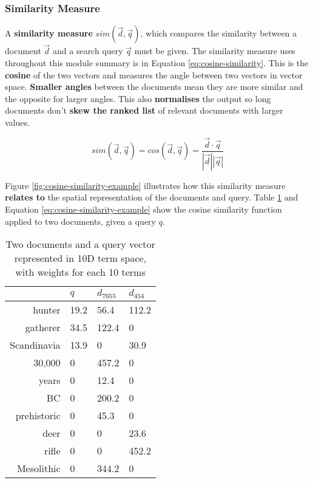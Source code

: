 \documentclass{article}
\begin{document}
\subsubsection{Similarity Measure}

A \textbf{similarity measure} $sim(\vec{d}, \vec{q})$, which compares the similarity between a document $\vec{d}$ and a search query $\vec{q}$ must be given. The similarity measure uses throughout this module summary is in Equation \ref{eq:cosine-similarity}. This is the \textbf{cosine} of the two vectors and measures the angle between two vectors in vector space. \textbf{Smaller angles} between the documents mean they are more similar and the opposite for larger angles. This also \textbf{normalises} the output so long documents don't \textbf{skew the ranked list} of relevant documents with larger values.

\begin{equation}
	sim(\vec{d}, \vec{q}) = cos(\vec{d}, \vec{q}) = \frac{\vec{d} \cdot \vec{q}}{|\vec{d}| |\vec{q}|}
	\label{eq:cosine-similarity}
\end{equation}

Figure \ref{fig:cosine-similarity-example} illustrates how this similarity measure \textbf{relates to} the spatial representation of the documents and query. Table \ref{tab:cosine-similarity-example} and Equation \ref{eq:cosine-similarity-example} show the cosine similarity function applied to two documents, given a query $q$.

\begin{table}[H]
	\centering
	\begin{tabular}{|r|l|l|l|}
		\hline
		& $q$ & $d_{7655}$ & $d_{454}$ \\
		\hline
		hunter & 19.2 & 56.4 & 112.2 \\
		gatherer & 34.5 & 122.4 & 0 \\
		Scandinavia & 13.9 & 0 & 30.9 \\
		30,000 & 0 & 457.2 & 0 \\
		years & 0 & 12.4 & 0 \\
		BC & 0 & 200.2 & 0 \\
		prehistoric & 0 & 45.3 & 0 \\
		deer & 0 & 0 & 23.6 \\
		rifle & 0 & 0 & 452.2 \\
		Mesolithic & 0 & 344.2 & 0 \\
		\hline
	\end{tabular}
	\caption{Two documents and a query vector represented in 10D term space, with weights for each 10 terms}
	\label{tab:cosine-similarity-example}
\end{table}
\end{document}
